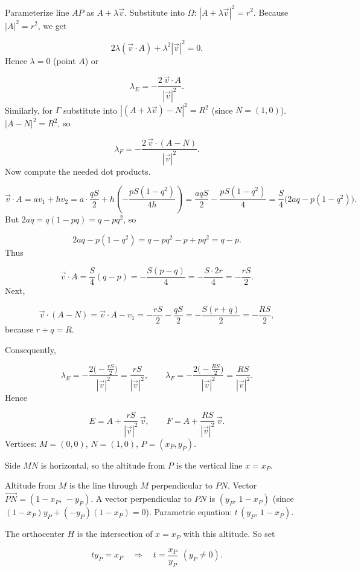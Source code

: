 Parameterize line \(AP\) as \(A + \lambda \vec{v}\). Substitute into \(\Omega\): \(|A + \lambda \vec{v}|^2 = r^2\). Because \(|A|^2 = r^2\), we get\par
\[
2\lambda (\vec{v}\cdot A) + \lambda^2 |\vec{v}|^2 = 0.
\]
Hence \(\lambda = 0\) (point \(A\)) or\par
\[
\lambda_E = -\frac{2\,\vec{v}\cdot A}{|\vec{v}|^2}.
\]
Similarly, for \(\Gamma\) substitute into \(|(A+\lambda\vec{v}) - N|^2 = R^2\) (since \(N=(1,0)\)). \(|A - N|^2 = R^2\), so\par
\[
\lambda_F = -\frac{2\,\vec{v}\cdot(A - N)}{|\vec{v}|^2}.
\]
Now compute the needed dot products.\par
\[
\vec{v}\cdot A = a v_1 + h v_2 = a\cdot\frac{q S}{2} + h\left(-\frac{p S (1 - q^2)}{4h}\right) = \frac{a q S}{2} - \frac{p S (1 - q^2)}{4}
= \frac{S}{4}\bigl(2a q - p(1 - q^2)\bigr).
\]
But \(2a q = q(1 - p q) = q - p q^2\), so\par
\[
2a q - p(1 - q^2) = q - p q^2 - p + p q^2 = q - p.
\]
Thus\par
\[
\vec{v}\cdot A = \frac{S}{4}(q - p) = -\frac{S(p - q)}{4} = -\frac{S\cdot 2r}{4} = -\frac{r S}{2}.
\]
Next,\par
\[
\vec{v}\cdot(A - N) = \vec{v}\cdot A - v_1 = -\frac{r S}{2} - \frac{q S}{2} = -\frac{S(r+q)}{2} = -\frac{R S}{2},
\]
because \(r+q = R\).\par
Consequently,\par
\[
\lambda_E = -\frac{2\bigl(-\frac{r S}{2}\bigr)}{|\vec{v}|^2} = \frac{r S}{|\vec{v}|^2},
\qquad
\lambda_F = -\frac{2\bigl(-\frac{R S}{2}\bigr)}{|\vec{v}|^2} = \frac{R S}{|\vec{v}|^2}.
\]
Hence\par
\[
E = A + \frac{r S}{|\vec{v}|^2}\,\vec{v},
\qquad
F = A + \frac{R S}{|\vec{v}|^2}\,\vec{v}.
\]
Vertices: \(M = (0,0)\), \(N = (1,0)\), \(P = (x_P, y_P)\).\par
Side \(MN\) is horizontal, so the altitude from \(P\) is the vertical line \(x = x_P\).\par
Altitude from \(M\) is the line through \(M\) perpendicular to \(PN\). Vector \(\overrightarrow{PN} = (1 - x_P,\,-y_P)\). A vector perpendicular to \(PN\) is \((y_P,\, 1 - x_P)\) (since \((1-x_P)y_P + (-y_P)(1-x_P)=0\)). Parametric equation: \(t\,(y_P,\,1 - x_P)\).\par
The orthocenter \(H\) is the intersection of \(x = x_P\) with this altitude. So set\par
\[
t y_P = x_P \quad\Longrightarrow\quad t = \frac{x_P}{y_P}\ \ (y_P \neq 0).
\]

